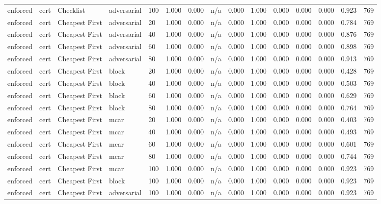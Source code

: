 \begin{table}[!ht]
{\begin{tabular}{lllllllllllllll}
enforced & cert & Checklist & adversarial & 100 & 1.000 & 0.000 & n/a & 0.000 & 1.000 & 0.000 & 0.000 & 0.000 & 0.923 & 769 \\
enforced & cert & Cheapest First & adversarial & 20 & 1.000 & 0.000 & n/a & 0.000 & 1.000 & 0.000 & 0.000 & 0.000 & 0.784 & 769 \\
enforced & cert & Cheapest First & adversarial & 40 & 1.000 & 0.000 & n/a & 0.000 & 1.000 & 0.000 & 0.000 & 0.000 & 0.876 & 769 \\
enforced & cert & Cheapest First & adversarial & 60 & 1.000 & 0.000 & n/a & 0.000 & 1.000 & 0.000 & 0.000 & 0.000 & 0.898 & 769 \\
enforced & cert & Cheapest First & adversarial & 80 & 1.000 & 0.000 & n/a & 0.000 & 1.000 & 0.000 & 0.000 & 0.000 & 0.913 & 769 \\
enforced & cert & Cheapest First & block & 20 & 1.000 & 0.000 & n/a & 0.000 & 1.000 & 0.000 & 0.000 & 0.000 & 0.428 & 769 \\
enforced & cert & Cheapest First & block & 40 & 1.000 & 0.000 & n/a & 0.000 & 1.000 & 0.000 & 0.000 & 0.000 & 0.503 & 769 \\
enforced & cert & Cheapest First & block & 60 & 1.000 & 0.000 & n/a & 0.000 & 1.000 & 0.000 & 0.000 & 0.000 & 0.629 & 769 \\
enforced & cert & Cheapest First & block & 80 & 1.000 & 0.000 & n/a & 0.000 & 1.000 & 0.000 & 0.000 & 0.000 & 0.764 & 769 \\
enforced & cert & Cheapest First & mcar & 20 & 1.000 & 0.000 & n/a & 0.000 & 1.000 & 0.000 & 0.000 & 0.000 & 0.403 & 769 \\
enforced & cert & Cheapest First & mcar & 40 & 1.000 & 0.000 & n/a & 0.000 & 1.000 & 0.000 & 0.000 & 0.000 & 0.493 & 769 \\
enforced & cert & Cheapest First & mcar & 60 & 1.000 & 0.000 & n/a & 0.000 & 1.000 & 0.000 & 0.000 & 0.000 & 0.601 & 769 \\
enforced & cert & Cheapest First & mcar & 80 & 1.000 & 0.000 & n/a & 0.000 & 1.000 & 0.000 & 0.000 & 0.000 & 0.744 & 769 \\
enforced & cert & Cheapest First & mcar & 100 & 1.000 & 0.000 & n/a & 0.000 & 1.000 & 0.000 & 0.000 & 0.000 & 0.923 & 769 \\
enforced & cert & Cheapest First & block & 100 & 1.000 & 0.000 & n/a & 0.000 & 1.000 & 0.000 & 0.000 & 0.000 & 0.923 & 769 \\
enforced & cert & Cheapest First & adversarial & 100 & 1.000 & 0.000 & n/a & 0.000 & 1.000 & 0.000 & 0.000 & 0.000 & 0.923 & 769 \\

\end{tabular}}
\end{table}
